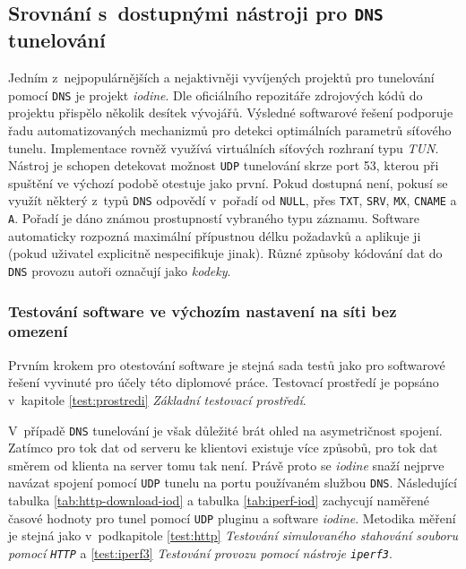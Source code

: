 \documentclass[thesis=M,czech]{FITthesis}[2012/10/20]
\begin{document}
\subsection{Srovnání s~dostupnými nástroji pro \texttt{DNS} tunelování}

Jedním z~nejpopulárnějších a nejaktivněji vyvíjených projektů pro tunelování pomocí \texttt{DNS} je projekt \textit{iodine}. Dle oficiálního repozitáře zdrojových kódů\cite{iodine-repo} do projektu přispělo několik desítek vývojářů. Výsledné softwarové řešení podporuje řadu automatizovaných mechanizmů pro detekci optimálních parametrů síťového tunelu. Implementace rovněž využívá virtuálních síťových rozhraní typu \textit{TUN}. Nástroj je schopen detekovat možnost \texttt{UDP} tunelování skrze port 53, kterou při spuštění ve výchozí podobě otestuje jako první. Pokud dostupná není, pokusí se využít některý z~typů \texttt{DNS} odpovědí v~pořadí od \texttt{NULL}, přes \texttt{TXT}, \texttt{SRV}, \texttt{MX}, \texttt{CNAME} a \texttt{A}. Pořadí je dáno známou prostupností vybraného typu záznamu\cite{iodine-repo}. Software automaticky rozpozná maximální přípustnou délku požadavků a aplikuje ji (pokud uživatel explicitně nespecifikuje jinak). Různé způsoby kódování dat do \texttt{DNS} provozu autoři označují jako \textit{kodeky}.

\subsubsection{Testování software ve výchozím nastavení na síti bez omezení}

Prvním krokem pro otestování software je stejná sada testů jako pro softwarové řešení vyvinuté pro účely této diplomové práce. Testovací prostředí je popsáno v~kapitole \ref{test:prostredi} \textit{Základní testovací prostředí}.

V~případě \texttt{DNS} tunelování je však důležité brát ohled na asymetričnost spojení. Zatímco pro tok dat od serveru ke klientovi existuje více způsobů, pro tok dat směrem od klienta na server tomu tak není. Právě proto se \textit{iodine} snaží nejprve navázat spojení pomocí \texttt{UDP} tunelu na portu používaném službou \texttt{DNS}. Následující tabulka \ref{tab:http-download-iod} a tabulka \ref{tab:iperf-iod} zachycují naměřené časové hodnoty pro tunel pomocí \texttt{UDP} pluginu a software \textit{iodine}. Metodika měření je stejná jako v~podkapitole \ref{test:http} \textit{Testování simulovaného stahování souboru pomocí \texttt{HTTP}} a \ref{test:iperf3} \textit{Testování provozu pomocí nástroje \texttt{iperf3}}.
\end{document}
